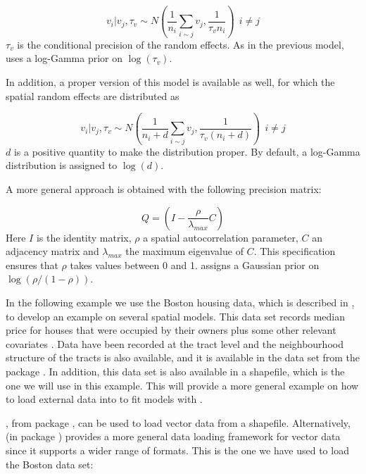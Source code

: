 \documentclass[article]{jss}
\begin{document}
\begin{equation}
v_i|v_j,\tau_v \sim  N( \frac{1}{n_i}\sum_{i\sim j} v_j, \frac{1}{\tau_vn_i})\ \  i\neq j
\end{equation}
\noindent
$\tau_v$ is the conditional precision of the random effects. As in the previous
model,  uses a log-Gamma prior on $\log(\tau_v)$.

In addition, a proper version of this model is available as well,
for which the spatial random effects are distributed as

\begin{equation}
v_i|v_j,\tau_v \sim  N( \frac{1}{n_i+d}\sum_{i\sim j} v_j, \frac{1}{\tau_v(n_i+d)})\ \ i\neq j
\end{equation}
\noindent
$d$ is a positive quantity to make the distribution proper. By default,
a log-Gamma distribution is assigned to $\log(d)$.

A more general approach is obtained  with the following precision
matrix:

\begin{equation}
Q = (I - \frac{\rho}{\lambda_{max}}C)
\end{equation}
\noindent
Here $I$ is the identity matrix, $\rho$ a spatial autocorrelation parameter,
$C$ an adjacency matrix and $\lambda_{max}$ the maximum eigenvalue of $C$.
This specification ensures that $\rho$ takes values between 0 and 1.
 assigns a Gaussian prior on $\log(\rho/(1-\rho))$.

In the following example we use the Boston housing data, which is described in
\citet{HarrisonRubinfeld:1978}, to develop an example on several spatial
models.  This data set  records median price for houses that were occupied by
their owners plus some other relevant covariates \citep[see,][for
details]{HarrisonRubinfeld:1978,pace+gilley:97}.
Data have been recorded at the tract level
and the neighbourhood structure of the tracts is also available, and it is
available in the  data set from the  package
 \citep{spdep:2013}. In addition, this data set is also available in
a shapefile, which is the one we will use in this example. This will provide a 
more general example on how to load external
data into  to fit models with .

, from package , can be used to load 
vector data from a shapefile. Alternatively,  (in package
) provides a more general data loading framework for vector data
since it supports a wider range of formats. This is the one we have used to
load the Boston data set:
\end{document}
